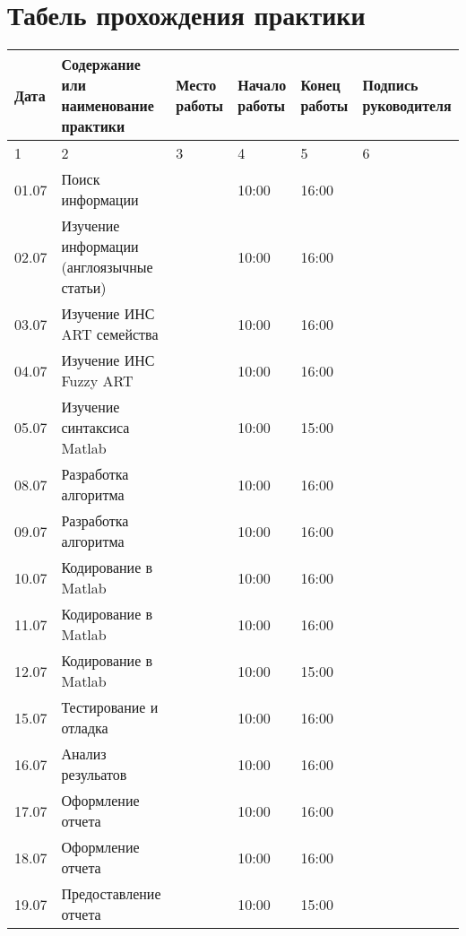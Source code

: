 \newpage
\section{Табель прохождения практики}

\begin{table}[h]
\begin{tabular}{|p{1cm}|p{6cm}|p{1.5cm}|p{1.5cm}|p{1.5cm}|p{2cm}|}
\hline
Дата  & Содержание или наименование практики & Место работы & Начало работы & Конец работы & Подпись руководителя \\ \hline
1     & 2                                    & 3            & 4             & 5            & 6         \\ \hline
01.07 & Поиск информации                     &              & 10:00         & 16:00        &           \\ \hline
02.07 & Изучение информации (англоязычные статьи) &         & 10:00         & 16:00        &           \\ \hline
03.07 & Изучение ИНС ART семейства           &         & 10:00         & 16:00        &           \\ \hline
04.07 & Изучение ИНС Fuzzy ART               &         & 10:00         & 16:00        &           \\ \hline
05.07 & Изучение синтаксиса Matlab           &              & 10:00         & 15:00        &           \\ \hline
08.07 & Разработка алгоритма                 &              & 10:00         & 16:00        &           \\ \hline
09.07 & Разработка алгоритма                 &              & 10:00         & 16:00        &           \\ \hline
10.07 & Кодирование   в Matlab               &              & 10:00         & 16:00        &           \\ \hline
11.07 & Кодирование   в Matlab               &              & 10:00         & 16:00        &           \\ \hline
12.07 & Кодирование   в Matlab               &              & 10:00         & 15:00        &           \\ \hline
15.07 & Тестирование и отладка               &              & 10:00         & 16:00        &           \\ \hline
16.07 & Анализ резульатов                    &              & 10:00         & 16:00        &           \\ \hline
17.07 & Оформление отчета                    &              & 10:00         & 16:00        &           \\ \hline
18.07 & Оформление отчета                    &              & 10:00         & 16:00        &           \\ \hline
19.07 & Предоставление отчета                &              & 10:00         & 15:00        &           \\ \hline

\end{tabular}
\end{table}